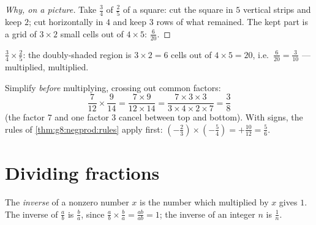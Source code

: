 \begin{proof}[Why, on a picture]
Take $\frac34$ of $\frac25$ of a square: cut the square in $5$
vertical strips and keep $2$; cut horizontally in $4$ and keep $3$
rows of what remained. The kept part is a grid of $3 \times 2$ small
cells out of $4 \times 5$:  $\frac{6}{20}$.
\end{proof}

\begin{omfigure}

{\small $\frac34 \times \frac25$: the doubly-shaded region is
$3 \times 2 = 6$ cells out of $4 \times 5 = 20$, i.e.\
$\frac{6}{20} = \frac{3}{10}$ ---  multiplied, 
multiplied.}
\end{omfigure}

\begin{example}\label{ex:g8:fractions:mult}
Simplify \emph{before} multiplying, crossing out common factors:
\[
\frac{7}{12} \times \frac{9}{14}
= \frac{7 \times 9}{12 \times 14}
= \frac{7 \times 3 \times 3}{3 \times 4 \times 2 \times 7}
= \frac{3}{8}
\]
(the factor $7$ and one factor $3$ cancel between top and bottom).
With signs, the rules of \cref{thm:g8:negprod:rules} apply first:
$\left(-\frac23\right) \times \left(-\frac{5}{4}\right) =
+\frac{10}{12} = \frac56$.
\end{example}

\section{Dividing fractions}

\begin{definition}[Inverse]\label{def:g8:fractions:inverse}
The \emph{inverse} of a nonzero number $x$ is the
number which multiplied by $x$ gives $1$. The inverse of
$\frac ab$ is $\frac ba$, since
$\frac ab \times \frac ba = \frac{ab}{ab} = 1$; the inverse of an
integer $n$ is $\frac1n$.
\end{definition}

